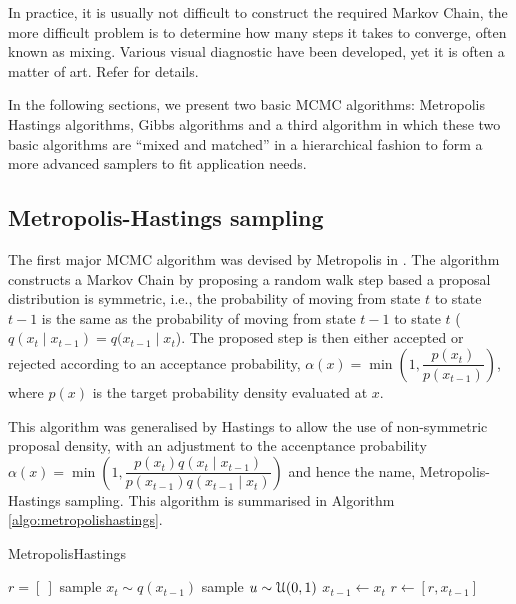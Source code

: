In practice, it is usually not difficult to construct the required Markov Chain, the more difficult problem is to determine how many steps it takes to converge, often known as mixing. Various visual diagnostic have been developed, yet it is often a matter of art. Refer \cite{RCP05} for details.

In the following sections, we present two basic MCMC algorithms: Metropolis Hastings algorithms, Gibbs algorithms and a third algorithm in which these two basic algorithms are ``mixed and matched'' in a hierarchical fashion to form a more advanced samplers to fit application needs.

\subsection{Metropolis-Hastings sampling}
The first major MCMC algorithm was devised by Metropolis in \cite{MN53}. The algorithm constructs a Markov Chain by proposing a random walk step based a proposal distribution is symmetric, i.e., the probability of moving from state $t$ to state $t-1$ is the same as the probability of moving from state $t-1$ to state $t$ ($q(x_{t} \mid x_{t-1}) = q(x_{t-1} \mid x_{t}$). The proposed step is then either accepted or rejected according to an acceptance probability, $\alpha(x)= \min\left(1, \dfrac{p(x_t)}{p(x_{t-1})}\right)$, where $p(x)$ is the target probability density evaluated at $x$.

This algorithm was generalised by Hastings \cite{WKH70} to allow the use of non-symmetric proposal density, with an adjustment to the accenptance probability $\alpha(x) = \min\left(1, \dfrac{p(x_t)q(x_t \mid x_{t-1})}{p(x_{t-1})q(x_{t-1} \mid x_{t})}\right)$ and hence the name, Metropolis-Hastings sampling. This algorithm is summarised in Algorithm \ref{algo:metropolishastings}.

\begin{algorithm}
\caption{MetropolisHastings}\label{algo:metropolishastings}
\begin{algorithmic}[1]
\State $r = [\ ]$
\Repeat
  \State sample $x_t \sim q(x_{t-1})$
  \State sample $u \sim {\cal U}(0,1)$
    \State $x_{t-1} \gets x_{t}$
    \State $r \gets [r,x_{t-1}]$
  \EndIf
{}
\EndFunction
\end{algorithmic}
\end{algorithm}

